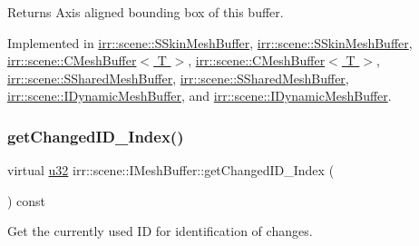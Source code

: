 \begin{DoxyReturn}{Returns}
Axis aligned bounding box of this buffer. 
\end{DoxyReturn}


Implemented in \hyperlink{structirr_1_1scene_1_1SSkinMeshBuffer_a350535b406a7607bd392d07e5c3f9401}{irr\+::scene\+::\+S\+Skin\+Mesh\+Buffer}, \hyperlink{structirr_1_1scene_1_1SSkinMeshBuffer_a350535b406a7607bd392d07e5c3f9401}{irr\+::scene\+::\+S\+Skin\+Mesh\+Buffer}, \hyperlink{classirr_1_1scene_1_1CMeshBuffer_a759863b44c024f79747019f492a5c7cf}{irr\+::scene\+::\+C\+Mesh\+Buffer$<$ T $>$}, \hyperlink{classirr_1_1scene_1_1CMeshBuffer_a759863b44c024f79747019f492a5c7cf}{irr\+::scene\+::\+C\+Mesh\+Buffer$<$ T $>$}, \hyperlink{structirr_1_1scene_1_1SSharedMeshBuffer_a5a736dee60a5f5ebc929dc03c0763082}{irr\+::scene\+::\+S\+Shared\+Mesh\+Buffer}, \hyperlink{structirr_1_1scene_1_1SSharedMeshBuffer_a5a736dee60a5f5ebc929dc03c0763082}{irr\+::scene\+::\+S\+Shared\+Mesh\+Buffer}, \hyperlink{classirr_1_1scene_1_1IDynamicMeshBuffer_a9053baee5a13c8b51e306d99e5ef7427}{irr\+::scene\+::\+I\+Dynamic\+Mesh\+Buffer}, and \hyperlink{classirr_1_1scene_1_1IDynamicMeshBuffer_a9053baee5a13c8b51e306d99e5ef7427}{irr\+::scene\+::\+I\+Dynamic\+Mesh\+Buffer}.

\mbox{\label{classirr_1_1scene_1_1IMeshBuffer_acc389d76856dfb06c3ba45a92315e6d8}} 
\subsubsection{\texorpdfstring{get\+Changed\+I\+D\+\_\+\+Index()}{getChangedID\_Index()}\hspace{0.1cm}{\footnotesize\ttfamily [1/2]}}
{\footnotesize\ttfamily virtual \hyperlink{namespaceirr_a0416a53257075833e7002efd0a18e804}{u32} irr\+::scene\+::\+I\+Mesh\+Buffer\+::get\+Changed\+I\+D\+\_\+\+Index (\begin{DoxyParamCaption}{ }\end{DoxyParamCaption}) const\hspace{0.3cm}{\ttfamily [pure virtual]}}



Get the currently used ID for identification of changes. 

